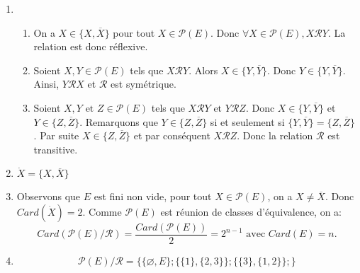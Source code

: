 
\begin{enumerate}
    \item \begin{enumerate}
        \item On a $X \in \{X, \overline{X}\}$ pour tout $X \in \mathcal{P}(E)$. Donc $\forall X \in \mathcal{P}(E), X\mathcal{R}Y$. La relation est donc réflexive.
        \item Soient $X,Y \in \mathcal{P}(E)$ tels que $X\mathcal{R}Y$. Alors $X \in \{Y, \overline{Y}\}$. Donc $Y \in \{Y, \overline{Y}\}$. Ainsi, $Y\mathcal{R}X$ et $\mathcal{R}$ est symétrique.
        \item Soient $X,Y \text{ et } Z \in \mathcal{P}(E)$ tels que $X\mathcal{R}Y \text{ et } Y\mathcal{R} Z$. Donc $X \in \{Y, \overline{Y}\}$ et $Y \in \{Z, \overline{Z}\}$. Remarquons que $Y \in \{Z, \overline{Z}\}$ si et seulement si $\{Y, \overline{Y}\} =\{Z, \overline{Z}\}$. Par suite $X \in \{Z, \overline{Z}\}$ et par conséquent $X\mathcal{R}Z$. Donc la relation $\mathcal{R}$ est transitive.
    \end{enumerate}
    \item $\dot{X}=\{X, \overline{X}\}$
    \item Observons que $E$ est fini non vide, pour tout $X \in \mathcal{P}(E)$, on a $X \neq \overline{X}$. Donc $Card(\dot{X})=2$. Comme $\mathcal{P}(E)$ est réunion de classes d'équivalence, on a:
    \begin{equation*}
        Card(\mathcal{P}(E)/\mathcal{R})=\frac{Card(\mathcal{P}(E))}{2}= 2^{n-1} \text{ avec } Card(E)=n.
    \end{equation*}
    \item \begin{equation*}
        \mathcal{P}(E)/\mathcal{R} = \Big\{\big\{\varnothing, E\big\}; \big\{\{1\}, \{2, 3\}\big\}; \big\{\{3\}, \{1, 2\}\big\};\Big\}
    \end{equation*}
\end{enumerate}

